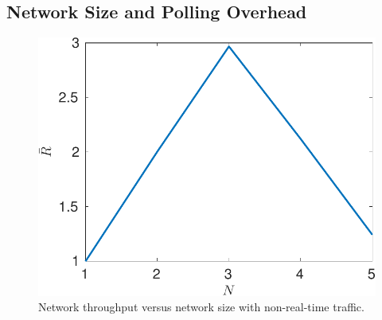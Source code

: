 \documentclass{article}
\begin{document}
\subsection{Network Size and Polling Overhead}
\begin{figure}[htbp]
\centering
\includegraphics[scale=0.7]{nonrealtime_throughput_N.pdf}
\caption{Network throughput versus network size with non-real-time traffic.}
\label{nonrealtime_throughput_N}
\end{figure}

\end{document}
